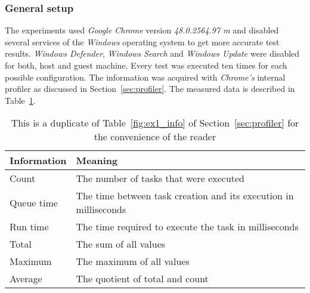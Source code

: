 \subsubsection{General setup}
The experiments used \emph{Google Chrome} version \emph{48.0.2564.97 m} and disabled several services of the \emph{Windows} operating system to get more accurate test results. \emph{Windows Defender}, \emph{Windows Search} and \emph{Windows Update} were disabled for both, host and guest machine. Every test was executed ten times for each possible configuration. The information was acquired with \emph{Chrome's} internal profiler as discussed in Section~\ref{sec:profiler}. The measured data is described in Table~\ref{fig:ex1_duplicate}.
\begin{table}[hb]
\caption{This is a duplicate of Table~\ref{fig:ex1_info} of Section~\ref{sec:profiler} for the convenience of the reader}
\label{fig:ex1_duplicate}
\begin{tabularx}{\textwidth}{|l|X|}
\hline
Information & Meaning \\ \hline
Count & The number of tasks that were executed \\ \hline
Queue time & The time between task creation and its execution in milliseconds \\ \hline
Run time & The time required to execute the task in milliseconds \\ \hline
Total & The sum of all values \\ \hline
Maximum & The maximum of all values \\ \hline
Average & The quotient of total and count \\ \hline
\end{tabularx}
\end{table}


\clearpage
